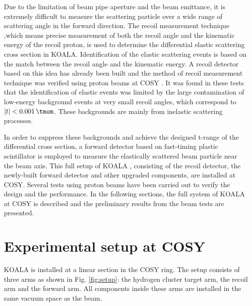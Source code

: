 \documentclass[number,5p]{elsarticle}
\begin{document}
Due to the limitation of beam pipe aperture and the beam emittance,
it is extremely difficult to measure the scattering particle over a wide range of scattering angle in the forward direction.
The recoil measurement technique ,which means precise measurement of both the recoil angle and the kinematic energy of the recoil proton, 
is used to determine the differential elastic scattering cross section in KOALA.
Identification of the elastic scattering events is based on the match between the recoil angle and the kinematic energy.
A recoil detector based on this idea has already been built and the method of recoil measurement technique was verified using proton beams at COSY \cite{recoil_article}.
It was found in these tests that the identification of elastic events was limited by the large contamination of low-energy
background events at very small recoil angles, which correspond to $|t| <
\SI{0.001}{\tmom}$.
These backgrounds are mainly from inelastic scattering processes.

In order to suppress these backgrounds and achieve the designed t-range of the
differential cross section, a forward detector based on fast-timing plastic scintillator is
employed to measure the elastically scattered beam particle near the beam axis.
This full setup of KOALA , consisting of the recoil detector, the newly-built forward detector and other upgraded components,  are installed at COSY.
Several tests using proton beams have been carried out to verify the design and the performance.
In the following sections,  the full system of KOALA at COSY is described and the preliminary results from the beam tests are presented.

\section{Experimental setup at COSY}
\label{sec:setup}

KOALA is installed at a linear section in the COSY ring.
The setup consists of three arms as shown in Fig. \ref{fig:setup}: the hydrogen
cluster target arm, the recoil arm and the forward arm.
All components inside these arms are installed in the same vacuum space as the beam.
\end{document}
